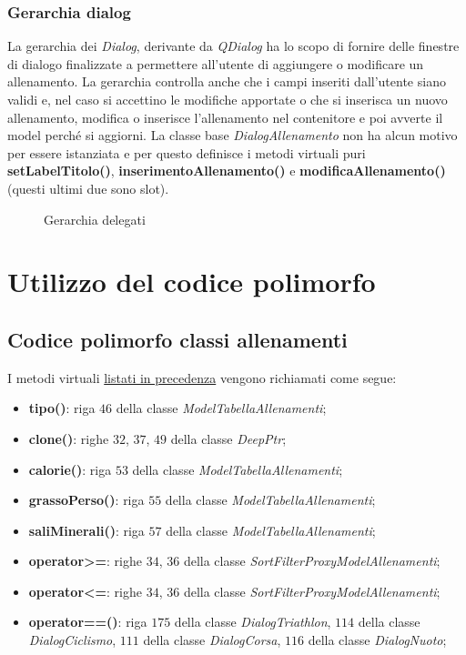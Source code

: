 \documentclass[10pt, a4paper]{article}
\begin{document}
\subsubsection{Gerarchia dialog}
La gerarchia dei \emph{Dialog}, derivante da \emph{QDialog} ha lo scopo di fornire delle finestre
di dialogo finalizzate a permettere all'utente di aggiungere o modificare un allenamento.
La gerarchia controlla anche che i campi inseriti dall'utente siano validi e, nel caso si accettino le modifiche
apportate o che si inserisca un nuovo allenamento, modifica o inserisce l'allenamento nel contenitore e poi avverte
il model perché si aggiorni.
La classe base \emph{DialogAllenamento} non ha alcun motivo per essere istanziata e per questo definisce i metodi
virtuali puri \textbf{setLabelTitolo()}, \textbf{inserimentoAllenamento()} e \textbf{modificaAllenamento()} (questi ultimi
due sono slot).
\begin{figure}[H]
	\centering
	\def\svgwidth{.75\linewidth}
	
	\label{figure:gerarchiaDialog}
	\caption{Gerarchia delegati}
\end{figure}

\section{Utilizzo del codice polimorfo}
\subsection{Codice polimorfo classi allenamenti}
I metodi virtuali \hyperref[sec:metodi]{listati in precedenza} vengono richiamati come segue:
\begin{itemize}
    \item \textbf{tipo()}: riga $46$ della classe \emph{ModelTabellaAllenamenti};
    \item \textbf{clone()}: righe $32$, $37$, $49$ della classe \emph{DeepPtr};
    \item \textbf{calorie()}: riga $53$ della classe \emph{ModelTabellaAllenamenti};
    \item \textbf{grassoPerso()}: riga $55$ della classe \emph{ModelTabellaAllenamenti};
    \item \textbf{saliMinerali()}: riga $57$ della classe \emph{ModelTabellaAllenamenti};
    \item \textbf{operator>=}: righe $34$, $36$ della classe \emph{SortFilterProxyModelAllenamenti};
    \item \textbf{operator<=}: righe $34$, $36$ della classe \emph{SortFilterProxyModelAllenamenti};
    \item \textbf{operator==()}: riga $175$ della classe \emph{DialogTriathlon}, 
        $114$ della classe \emph{DialogCiclismo}, $111$ della classe \emph{DialogCorsa},
        $116$ della classe \emph{DialogNuoto};
\end{itemize}
\end{document}
